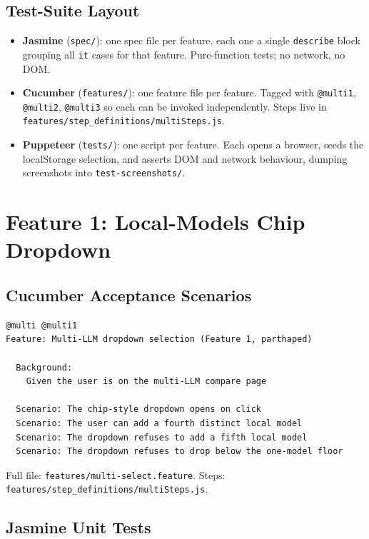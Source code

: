 \documentclass[11pt]{article}
\begin{document}
\subsection{Test-Suite Layout}

\begin{itemize}[leftmargin=*]
  \item \textbf{Jasmine} (\texttt{spec/}): one spec file per feature,
    each one a single \texttt{describe} block grouping all
    \texttt{it} cases for that feature.  Pure-function tests; no
    network, no DOM.
  \item \textbf{Cucumber} (\texttt{features/}): one feature file per
    feature.  Tagged with \texttt{@multi1}, \texttt{@multi2},
    \texttt{@multi3} so each can be invoked independently.  Steps
    live in
    \texttt{features/step\_definitions/multiSteps.js}.
  \item \textbf{Puppeteer} (\texttt{tests/}): one script per feature.
    Each opens a browser, seeds the localStorage selection, and asserts
    DOM and network behaviour, dumping screenshots into
    \texttt{test-screenshots/}.
\end{itemize}

\section{Feature 1: Local-Models Chip Dropdown}

\subsection{Cucumber Acceptance Scenarios}

\begin{lstlisting}
@multi @multi1
Feature: Multi-LLM dropdown selection (Feature 1, parthaped)

  Background:
    Given the user is on the multi-LLM compare page

  Scenario: The chip-style dropdown opens on click
  Scenario: The user can add a fourth distinct local model
  Scenario: The dropdown refuses to add a fifth local model
  Scenario: The dropdown refuses to drop below the one-model floor
\end{lstlisting}

Full file: \texttt{features/multi-select.feature}.  Steps:
\texttt{features/step\_definitions/multiSteps.js}.

\subsection{Jasmine Unit Tests}
\end{document}
